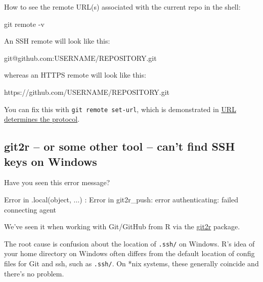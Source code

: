 \documentclass[
]{book}
\newenvironment{Shaded}{\begin{snugshade}}{\end{snugshade}}
\newcommand{\NormalTok}[1]{#1}
\begin{document}
How to see the remote URL(s) associated with the current repo in the shell:

\begin{Shaded}
\begin{Highlighting}[]
\NormalTok{git remote {-}v}
\end{Highlighting}
\end{Shaded}

An SSH remote will look like this:

\begin{Shaded}
\begin{Highlighting}[]
\NormalTok{git@github.com:USERNAME/REPOSITORY.git}
\end{Highlighting}
\end{Shaded}

whereas an HTTPS remote will look like this:

\begin{Shaded}
\begin{Highlighting}[]
\NormalTok{https://github.com/USERNAME/REPOSITORY.git}
\end{Highlighting}
\end{Shaded}

You can fix this with \texttt{git\ remote\ set-url}, which is demonstrated in \hyperref[url-determines-protocol]{URL determines the protocol}.

\subsection{git2r -- or some other tool -- can't find SSH keys on Windows}\label{git2r-or-some-other-tool-cant-find-ssh-keys-on-windows}

Have you seen this error message?

\begin{Shaded}
\begin{Highlighting}[]
\NormalTok{Error in .local(object, ...) : }
\NormalTok{  Error in \textquotesingle{}git2r\_push\textquotesingle{}: error authenticating: failed connecting agent}
\end{Highlighting}
\end{Shaded}

We've seen it when working with Git/GitHub from R via the \href{https://cran.r-project.org/web/packages/git2r/index.html}{git2r} package.

The root cause is confusion about the location of \texttt{.ssh/} on Windows.
R's idea of your home directory on Windows often differs from the default location of config files for Git and ssh, such as \texttt{.ssh/}.
On *nix systems, these generally coincide and there's no problem.
\end{document}
